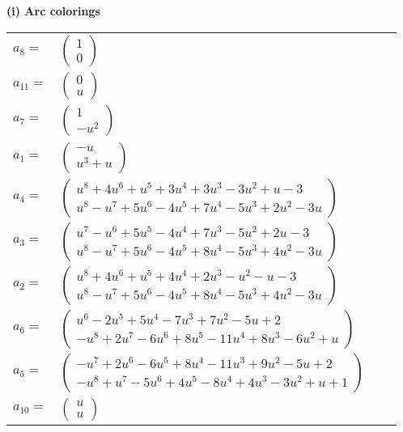 \documentclass[1p]{elsarticle_modified}
\theoremstyle{definition}
\begin{document}
\flushleft \textbf{(i) Arc colorings}\\
\begin{tabular}{m{7pt} m{180pt} m{7pt} m{180pt} }
\flushright $a_{8}=$&$\begin{pmatrix}1\\0\end{pmatrix}$ \\
\flushright $a_{11}=$&$\begin{pmatrix}0\\u\end{pmatrix}$ \\
\flushright $a_{7}=$&$\begin{pmatrix}1\\- u^2\end{pmatrix}$ \\
\flushright $a_{1}=$&$\begin{pmatrix}- u\\u^3+u\end{pmatrix}$ \\
\flushright $a_{4}=$&$\begin{pmatrix}u^8+4 u^6+u^5+3 u^4+3 u^3-3 u^2+u-3\\u^8- u^7+5 u^6-4 u^5+7 u^4-5 u^3+2 u^2-3 u\end{pmatrix}$ \\
\flushright $a_{3}=$&$\begin{pmatrix}u^7- u^6+5 u^5-4 u^4+7 u^3-5 u^2+2 u-3\\u^8- u^7+5 u^6-4 u^5+8 u^4-5 u^3+4 u^2-3 u\end{pmatrix}$ \\
\flushright $a_{2}=$&$\begin{pmatrix}u^8+4 u^6+u^5+4 u^4+2 u^3- u^2- u-3\\u^8- u^7+5 u^6-4 u^5+8 u^4-5 u^3+4 u^2-3 u\end{pmatrix}$ \\
\flushright $a_{6}=$&$\begin{pmatrix}u^6-2 u^5+5 u^4-7 u^3+7 u^2-5 u+2\\- u^8+2 u^7-6 u^6+8 u^5-11 u^4+8 u^3-6 u^2+u\end{pmatrix}$ \\
\flushright $a_{5}=$&$\begin{pmatrix}- u^7+2 u^6-6 u^5+8 u^4-11 u^3+9 u^2-5 u+2\\- u^8+u^7-5 u^6+4 u^5-8 u^4+4 u^3-3 u^2+u+1\end{pmatrix}$ \\
\flushright $a_{10}=$&$\begin{pmatrix}u\\u\end{pmatrix}$ \\

\end{tabular}
\end{document}
